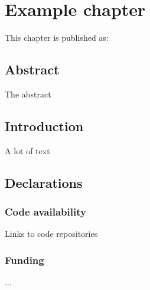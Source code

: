 \chapter{Example chapter}
\label{chapter1}

This chapter is published as:

\begin{refsection}[ownpubs]
  \small
\end{refsection}

%
\begin{refsection}[chapter1]
\section{Abstract}

The abstract

%
\section{Introduction}

A lot of  text \cite{Einstein1905:2}

%
\FloatBarrier
\section{Declarations}
%
\subsection{Code availability}

Links to code repositories

%
\subsection{Funding}

...

%
\printbibliography[heading=subbibnumbered, title={Bibliography}]
\end{refsection}
